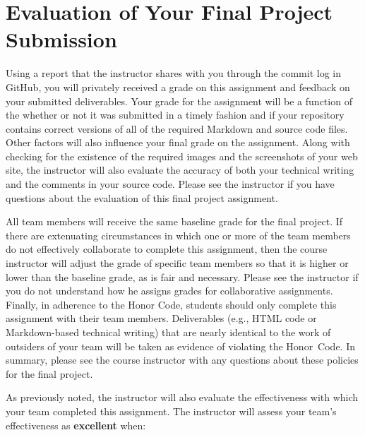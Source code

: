 \documentclass[11pt]{article}
\begin{document}
\vspace*{-.1in}

\section*{Evaluation of Your Final Project Submission}

Using a report that the instructor shares with you through the commit log in
GitHub, you will privately received a grade on this assignment and feedback on
your submitted deliverables. Your grade for the assignment will be a function of
the whether or not it was submitted in a timely fashion and if your repository
contains correct versions of all of the required Markdown and source code files.
Other factors will also influence your final grade on the assignment. Along with
checking for the existence of the required images and the screenshots of your
web site, the instructor will also evaluate the accuracy of both your technical
writing and the comments in your source code. Please see the instructor if you
have questions about the evaluation of this final project assignment.

All team members will receive the same baseline grade for the final project. If
there are extenuating circumstances in which one or more of the team members do
not effectively collaborate to complete this assignment, then the course
instructor will adjust the grade of specific team members so that it is higher
or lower than the baseline grade, as is fair and necessary. Please see the
instructor if you do not understand how he assigns grades for collaborative
assignments. Finally, in adherence to the Honor Code, students should only
complete this assignment with their team members. Deliverables (e.g., HTML code
or Markdown-based technical writing) that are nearly identical to the work of
outsiders of your team will be taken as evidence of violating the \mbox{Honor
Code}. In summary, please see the course instructor with any questions about
these policies for the final project.

As previously noted, the instructor will also evaluate the effectiveness with
which your team completed this assignment. The instructor will assess your
team's effectiveness as {\bf excellent} when:

\vspace*{-.5em}
\end{document}
